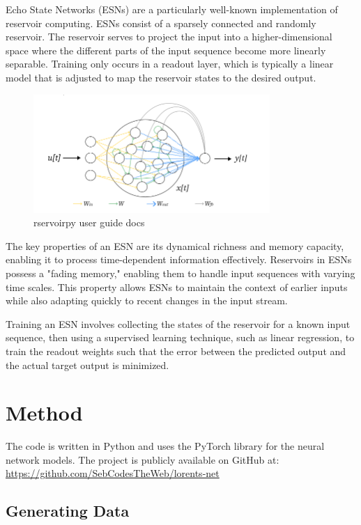 \documentclass[11pt]{article}
\begin{document}
Echo State Networks (ESNs) are a particularly well-known implementation of reservoir computing. ESNs consist of a sparsely connected and randomly reservoir. The reservoir serves to project the input into a higher-dimensional space where the different parts of the input sequence become more linearly separable. Training only occurs in a readout layer, which is typically a linear model that is adjusted to map the reservoir states to the desired output.

\begin{figure}[h] 
\centering 
\includegraphics[width=0.8\textwidth]{echo_diagram.png} 
\caption{rservoirpy user guide docs}
\end{figure}

The key properties of an ESN are its dynamical richness and memory capacity, enabling it to process time-dependent information effectively. Reservoirs in ESNs possess a "fading memory," enabling them to handle input sequences with varying time scales. This property allows ESNs to maintain the context of earlier inputs while also adapting quickly to recent changes in the input stream.

Training an ESN involves collecting the states of the reservoir for a known input sequence, then using a supervised learning technique, such as linear regression, to train the readout weights such that the error between the predicted output and the actual target output is minimized.

\section{Method}
The code is written in Python and uses the PyTorch library for the neural network models. The project is publicly available on GitHub at: \url{https://github.com/SebCodesTheWeb/lorents-net}


\subsection{Generating Data}
\end{document}

